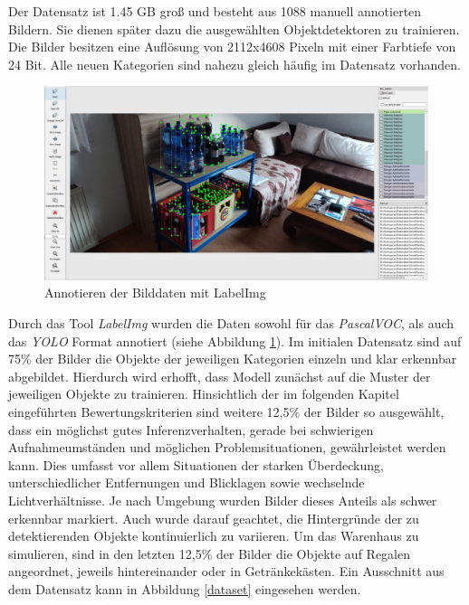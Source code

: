 Der Datensatz ist 1.45 GB groß und besteht aus 1088 manuell annotierten Bildern. Sie dienen später dazu die ausgewählten Objektdetektoren zu trainieren. Die Bilder besitzen eine Auflösung von 2112x4608 Pixeln mit einer Farbtiefe von 24 Bit. Alle neuen Kategorien sind nahezu gleich häufig im Datensatz vorhanden. 

\begin{figure}[H]
	\begin{center}
		\includegraphics[width=16cm]{Bilder/labelImg.jpeg} 
		\caption[Annotieren der Bilddaten mit labelImg]{Annotieren der Bilddaten mit LabelImg}
		\label{labelImg}
	\end{center}
\end{figure}

Durch das Tool \textit{LabelImg} wurden die Daten sowohl für das \textit{PascalVOC}, als auch das \textit{YOLO} Format annotiert (siehe Abbildung \ref{labelImg}). Im initialen Datensatz sind auf 75\% der Bilder die Objekte der jeweiligen Kategorien einzeln und klar erkennbar abgebildet. Hierdurch wird erhofft, dass Modell zunächst auf die Muster der jeweiligen Objekte zu trainieren. Hinsichtlich der im folgenden Kapitel eingeführten Bewertungskriterien sind weitere 12,5\% der Bilder so ausgewählt, dass ein möglichst gutes Inferenzverhalten, gerade bei schwierigen Aufnahmeumständen und möglichen Problemsituationen, gewährleistet werden kann. Dies umfasst vor allem Situationen der starken Überdeckung, unterschiedlicher Entfernungen und Blicklagen sowie wechselnde Lichtverhältnisse. Je nach Umgebung wurden Bilder dieses Anteils als schwer erkennbar markiert. Auch wurde darauf geachtet, die Hintergründe der zu detektierenden Objekte kontinuierlich zu variieren. Um das Warenhaus zu simulieren, sind in den letzten 12,5\% der Bilder die Objekte auf Regalen angeordnet, jeweils hintereinander oder in Getränkekästen. Ein Ausschnitt aus dem Datensatz kann in Abbildung \ref{dataset} eingesehen werden. 


